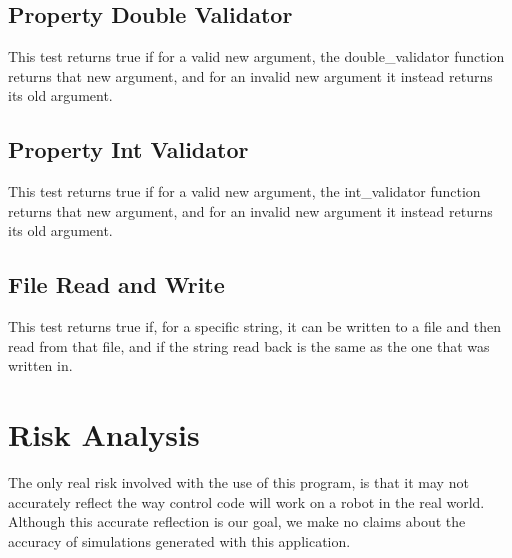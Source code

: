 \subsection{Property Double Validator}
This test returns true if for a valid new argument, the double\_validator function returns that new argument, and for an invalid new argument it instead returns its old argument.

\subsection{Property Int Validator}
This test returns true if for a valid new argument, the int\_validator function returns that new argument, and for an invalid new argument it instead returns its old argument.

\subsection{File Read and Write}
This test returns true if, for a specific string, it can be written to a file and then read from that file, and if the string read back is the same as the one that was written in.

\section{Risk Analysis}
The only real risk involved with the use of this program, is that it may not accurately reflect the way control code will work on a robot in the real world. Although this accurate reflection is our goal, we make no claims about the accuracy of simulations generated with this application.